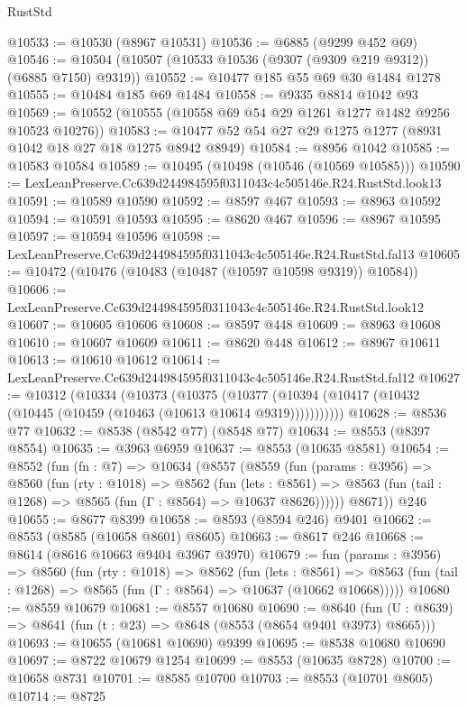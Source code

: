 \begin{lexlean}{RustStd}
\begin{coremodule}
@10533 := @10530 (@8967 @10531)
@10536 := @6885 (@9299 @452 @69)
@10546 := @10504 (@10507 (@10533 @10536 (@9307 (@9309 @219 @9312)) (@6885 @7150) @9319))
@10552 := @10477 @185 @55 @69 @30 @1484 @1278
@10555 := @10484 @185 @69 @1484
@10558 := @9335 @8814 @1042 @93
@10569 := @10552 (@10555 (@10558 @69 @54 @29 @1261 @1277 @1482 @9256 @10523 @10276))
@10583 := @10477 @52 @54 @27 @29 @1275 @1277 (@8931 @1042 @18 @27 @18 @1275 @8942 @8949)
@10584 := @8956 @1042
@10585 := @10583 @10584
@10589 := @10495 (@10498 (@10546 (@10569 @10585)))
@10590 := LexLeanPreserve.Cc639d244984595f0311043c4c505146e.R24.RustStd.look13
@10591 := @10589 @10590
@10592 := @8597 @467
@10593 := @8963 @10592
@10594 := @10591 @10593
@10595 := @8620 @467
@10596 := @8967 @10595
@10597 := @10594 @10596
@10598 := LexLeanPreserve.Cc639d244984595f0311043c4c505146e.R24.RustStd.fal13
@10605 := @10472 (@10476 (@10483 (@10487 (@10597 @10598 @9319)) @10584))
@10606 := LexLeanPreserve.Cc639d244984595f0311043c4c505146e.R24.RustStd.look12
@10607 := @10605 @10606
@10608 := @8597 @448
@10609 := @8963 @10608
@10610 := @10607 @10609
@10611 := @8620 @448
@10612 := @8967 @10611
@10613 := @10610 @10612
@10614 := LexLeanPreserve.Cc639d244984595f0311043c4c505146e.R24.RustStd.fal12
@10627 := @10312
    (@10334
      (@10373
        (@10375
          (@10377 (@10394 (@10417 (@10432 (@10445 (@10459 (@10463 (@10613 @10614 @9319)))))))))))
@10628 := @8536 @77
@10632 := @8538 (@8542 @77) (@8548 @77)
@10634 := @8553 (@8397 @8554)
@10635 := @3963 @6959
@10637 := @8553 (@10635 @8581)
@10654 := @8552
    (fun (fn : @7) =>
    @10634
      (@8557
        (@8559
          (fun (params : @3956) =>
          @8560
            (fun (rty : @1018) =>
            @8562
              (fun (lets : @8561) =>
              @8563 (fun (tail : @1268) => @8565 (fun (Γ : @8564) => @10637 @8626))))))
        @8671))
    @246
@10655 := @8677 @8399
@10658 := @8593 (@8594 @246) @9401
@10662 := @8553 (@8585 (@10658 @8601) @8605)
@10663 := @8617 @246
@10668 := @8614 (@8616 @10663 @9404 @3967 @3970)
@10679 := fun (params : @3956) =>
  @8560
    (fun (rty : @1018) =>
    @8562
      (fun (lets : @8561) =>
      @8563 (fun (tail : @1268) => @8565 (fun (Γ : @8564) => @10637 (@10662 @10668)))))
@10680 := @8559 @10679
@10681 := @8557 @10680
@10690 := @8640
    (fun (U : @8639) => @8641 (fun (t : @23) => @8648 (@8553 (@8654 @9401 @3973) @8665)))
@10693 := @10655 (@10681 @10690) @9399
@10695 := @8538 @10680 @10690
@10697 := @8722 @10679 @1254
@10699 := @8553 (@10635 @8728)
@10700 := @10658 @8731
@10701 := @8585 @10700
@10703 := @8553 (@10701 @8605)
@10714 := @8725

\end{coremodule}
\end{lexlean}
